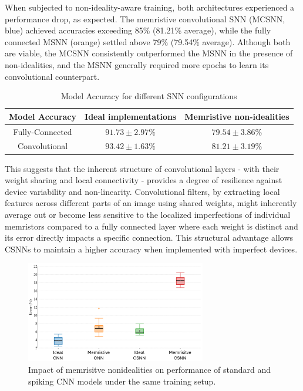 \noindent When subjected to non-ideality-aware training, both architectures experienced a performance drop, as expected. The memristive convolutional SNN (MCSNN, blue) achieved accuracies exceeding 85\% (81.21\% average), while the fully connected MSNN (orange) settled above 79\% (79.54\% average). Although both are viable, the MCSNN consistently outperformed the MSNN in the presence of non-idealities, and the MSNN generally required more epochs to learn its convolutional counterpart.\\

\begin{table}[!t]
    \caption{Model Accuracy for different SNN configurations}
    \begin{center}
    \begin{tabular}{|c|c|c|}
    \hline
    Model Accuracy  & Ideal implementations & Memristive non-idealities \\ \hline
    Fully-Connected & $91.73 \pm 2.97 \%$  & $79.54 \pm 3.86 \%$ \\ \hline
    Convolutional   & $93.42 \pm 1.63 \%$  & $81.21 \pm 3.19 \%$  \\ \hline
    \end{tabular}
    \label{table:6a}
    \end{center}
    \vspace*{-\baselineskip}
\end{table}

\noindent This suggests that the inherent structure of convolutional layers - with their weight sharing and local connectivity - provides a degree of resilience against device variability and non-linearity. Convolutional filters, by extracting local features across different parts of an image using shared weights, might inherently average out or become less sensitive to the localized imperfections of individual memristors compared to a fully connected layer where each weight is distinct and its error directly impacts a specific connection. This structural advantage allows CSNNs to maintain a higher accuracy when implemented with imperfect devices.\\

\begin{figure}[htbp!] 
    \centering    
    \includegraphics[width=0.7\textwidth]{Chapter6/Figs/l.png}
    \caption[Impact of memrisitve nonidealities on performance of standard and spiking CNN models under the same training setup.]{Impact of memrisitve nonidealities on performance of standard and spiking CNN models under the same training setup.}
    \label{fig:6l}
\end{figure}

